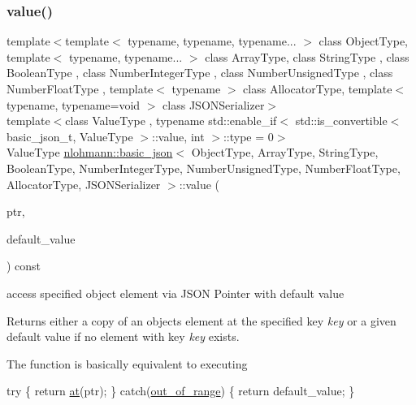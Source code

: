 \subsubsection{\texorpdfstring{value()}{value()}\hspace{0.1cm}{\footnotesize\ttfamily [3/4]}}
{\footnotesize\ttfamily template$<$template$<$ typename, typename, typename... $>$ class Object\+Type, template$<$ typename, typename... $>$ class Array\+Type, class String\+Type , class Boolean\+Type , class Number\+Integer\+Type , class Number\+Unsigned\+Type , class Number\+Float\+Type , template$<$ typename $>$ class Allocator\+Type, template$<$ typename, typename=void $>$ class J\+S\+O\+N\+Serializer$>$ \\
template$<$class Value\+Type , typename std\+::enable\+\_\+if$<$ std\+::is\+\_\+convertible$<$ basic\+\_\+json\+\_\+t, Value\+Type $>$\+::value, int $>$\+::type  = 0$>$ \\
Value\+Type \hyperlink{classnlohmann_1_1basic__json}{nlohmann\+::basic\+\_\+json}$<$ Object\+Type, Array\+Type, String\+Type, Boolean\+Type, Number\+Integer\+Type, Number\+Unsigned\+Type, Number\+Float\+Type, Allocator\+Type, J\+S\+O\+N\+Serializer $>$\+::value (\begin{DoxyParamCaption}\item[{const \hyperlink{classnlohmann_1_1basic__json_a6886a5001f5b449ad316101a311ce536}{json\+\_\+pointer} \&}]{ptr,  }\item[{const Value\+Type \&}]{default\+\_\+value }\end{DoxyParamCaption}) const\hspace{0.3cm}{\ttfamily [inline]}}



access specified object element via J\+S\+ON Pointer with default value 

Returns either a copy of an object\textquotesingle{}s element at the specified key {\itshape key} or a given default value if no element with key {\itshape key} exists.

The function is basically equivalent to executing 
\begin{DoxyCode}
\textcolor{keywordflow}{try} \{
    \textcolor{keywordflow}{return} \hyperlink{classnlohmann_1_1basic__json_a73ae333487310e3302135189ce8ff5d8}{at}(ptr);
\} \textcolor{keywordflow}{catch}(\hyperlink{classnlohmann_1_1basic__json_a28f7c2f087274a0012eb7a2333ee1580}{out\_of\_range}) \{
    \textcolor{keywordflow}{return} default\_value;
\}
\end{DoxyCode}


